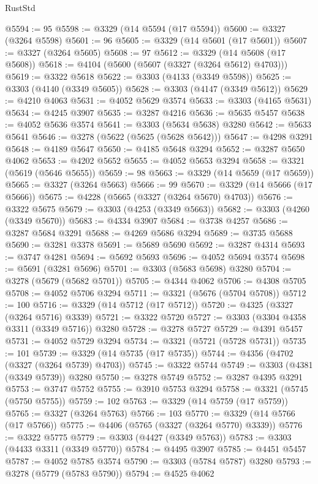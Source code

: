 \begin{lexlean}{RustStd}
\begin{coremodule}
{\begin{coremodule}
{{{{{{{{{{{{{{{{{{{{{{{{{{{{{{{{{@5594 := 95
@5598 := @3329 (@14 @5594 (@17 @5594))
@5600 := @3327 (@3264 @5598)
@5601 := 96
@5605 := @3329 (@14 @5601 (@17 @5601))
@5607 := @3327 (@3264 @5605)
@5608 := 97
@5612 := @3329 (@14 @5608 (@17 @5608))
@5618 := @4104 (@5600 (@5607 (@3327 (@3264 @5612) @4703)))
@5619 := @3322 @5618
@5622 := @3303 (@4133 (@3349 @5598))
@5625 := @3303 (@4140 (@3349 @5605))
@5628 := @3303 (@4147 (@3349 @5612))
@5629 := @4210 @4063
@5631 := @4052 @5629 @3574
@5633 := @3303 (@4165 @5631)
@5634 := @4245 @3907
@5635 := @3287 @4216
@5636 := @5635 @5457
@5638 := @4052 @5636 @3574
@5641 := @3303 (@5634 @5638) @3280
@5642 := @5633 @5641
@5646 := @3278 (@5622 (@5625 (@5628 @5642)))
@5647 := @4298 @3291
@5648 := @4189 @5647
@5650 := @4185 @5648 @3294
@5652 := @3287 @5650 @4062
@5653 := @4202 @5652
@5655 := @4052 @5653 @3294
@5658 := @3321 (@5619 (@5646 @5655))
@5659 := 98
@5663 := @3329 (@14 @5659 (@17 @5659))
@5665 := @3327 (@3264 @5663)
@5666 := 99
@5670 := @3329 (@14 @5666 (@17 @5666))
@5675 := @4228 (@5665 (@3327 (@3264 @5670) @4703))
@5676 := @3322 @5675
@5679 := @3303 (@4253 (@3349 @5663))
@5682 := @3303 (@4260 (@3349 @5670))
@5683 := @4334 @3907
@5684 := @3738 @4257
@5686 := @3287 @5684 @3291
@5688 := @4269 @5686 @3294
@5689 := @3735 @5688
@5690 := @3281 @3378
@5691 := @5689 @5690
@5692 := @3287 @4314
@5693 := @3747 @4281
@5694 := @5692 @5693
@5696 := @4052 @5694 @3574
@5698 := @5691 (@3281 @5696)
@5701 := @3303 (@5683 @5698) @3280
@5704 := @3278 (@5679 (@5682 @5701))
@5705 := @4344 @4062
@5706 := @4308 @5705
@5708 := @4052 @5706 @3294
@5711 := @3321 (@5676 (@5704 @5708))
@5712 := 100
@5716 := @3329 (@14 @5712 (@17 @5712))
@5720 := @4325 (@3327 (@3264 @5716) @3339)
@5721 := @3322 @5720
@5727 := @3303 (@3304 @4358 @3311 (@3349 @5716)) @3280
@5728 := @3278 @5727
@5729 := @4391 @5457
@5731 := @4052 @5729 @3294
@5734 := @3321 (@5721 (@5728 @5731))
@5735 := 101
@5739 := @3329 (@14 @5735 (@17 @5735))
@5744 := @4356 (@4702 (@3327 (@3264 @5739) @4703))
@5745 := @3322 @5744
@5749 := @3303 (@4381 (@3349 @5739)) @3280
@5750 := @3278 @5749
@5752 := @3287 @4395 @3291
@5753 := @3747 @5752
@5755 := @3910 @5753 @3294
@5758 := @3321 (@5745 (@5750 @5755))
@5759 := 102
@5763 := @3329 (@14 @5759 (@17 @5759))
@5765 := @3327 (@3264 @5763)
@5766 := 103
@5770 := @3329 (@14 @5766 (@17 @5766))
@5775 := @4406 (@5765 (@3327 (@3264 @5770) @3339))
@5776 := @3322 @5775
@5779 := @3303 (@4427 (@3349 @5763))
@5783 := @3303 (@4433 @3311 (@3349 @5770))
@5784 := @4495 @3907
@5785 := @4451 @5457
@5787 := @4052 @5785 @3574
@5790 := @3303 (@5784 @5787) @3280
@5793 := @3278 (@5779 (@5783 @5790))
@5794 := @4525 @4062
}}}}}}}}}}}}}}}}}}}}}}}}}}}}}}}}}
\end{coremodule}}
\end{coremodule}
\end{lexlean}
